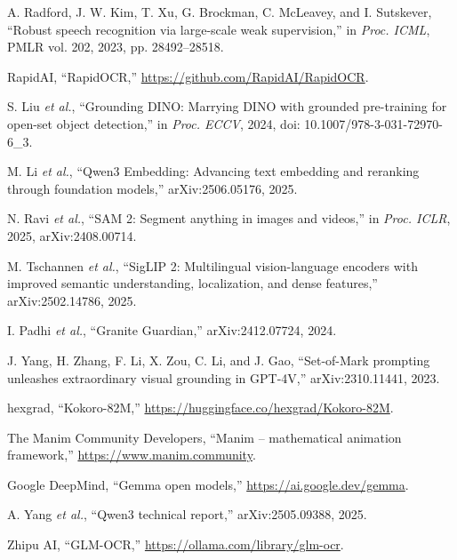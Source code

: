 \documentclass[9pt,a4paper]{extarticle}
\begin{document}
{\begin{enumerate}[label={[\arabic*]},leftmargin=*,itemsep=0pt,topsep=2pt]
\item A. Radford, J. W. Kim, T. Xu, G. Brockman, C. McLeavey, and I. Sutskever, ``Robust speech recognition via
large-scale weak supervision,'' in \emph{Proc. ICML}, PMLR vol. 202, 2023, pp. 28492--28518.
\item RapidAI, ``RapidOCR,'' \url{https://github.com/RapidAI/RapidOCR}.
\item S. Liu \emph{et al.}, ``Grounding DINO: Marrying DINO with grounded pre-training for open-set object detection,''
in \emph{Proc. ECCV}, 2024, doi: 10.1007/978-3-031-72970-6\_3.
\item M. Li \emph{et al.}, ``Qwen3 Embedding: Advancing text embedding and reranking through foundation models,''
arXiv:2506.05176, 2025.
\item N. Ravi \emph{et al.}, ``SAM 2: Segment anything in images and videos,'' in \emph{Proc. ICLR}, 2025,
arXiv:2408.00714.
\item M. Tschannen \emph{et al.}, ``SigLIP 2: Multilingual vision-language encoders with improved semantic
understanding, localization, and dense features,'' arXiv:2502.14786, 2025.
\item I. Padhi \emph{et al.}, ``Granite Guardian,'' arXiv:2412.07724, 2024.
\item J. Yang, H. Zhang, F. Li, X. Zou, C. Li, and J. Gao, ``Set-of-Mark prompting unleashes extraordinary visual
grounding in GPT-4V,'' arXiv:2310.11441, 2023.
\item hexgrad, ``Kokoro-82M,'' \url{https://huggingface.co/hexgrad/Kokoro-82M}.
\item The Manim Community Developers, ``Manim -- mathematical animation framework,'' \url{https://www.manim.community}.
\item Google DeepMind, ``Gemma open models,'' \url{https://ai.google.dev/gemma}.
\item A. Yang \emph{et al.}, ``Qwen3 technical report,'' arXiv:2505.09388, 2025.
\item Zhipu AI, ``GLM-OCR,'' \url{https://ollama.com/library/glm-ocr}.
\end{enumerate}}
\end{document}
